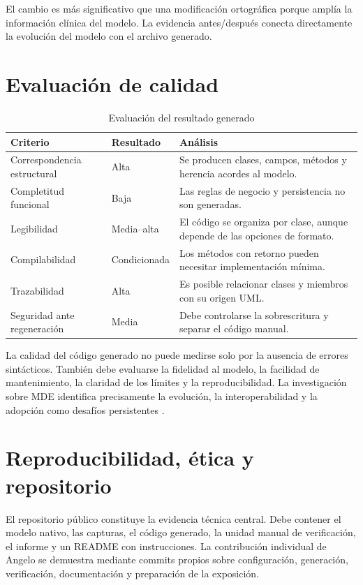El cambio es más significativo que una modificación ortográfica porque amplía la información clínica del modelo. La evidencia antes/después conecta directamente la evolución del modelo con el archivo generado.

\section{Evaluación de calidad}
\begin{table}[H]
\centering
\caption{Evaluación del resultado generado}
\begin{tabularx}{\textwidth}{L{4cm}C{2.2cm}X}
\toprule
\textbf{Criterio} & \textbf{Resultado} & \textbf{Análisis} \\
\midrule
Correspondencia estructural & Alta & Se producen clases, campos, métodos y herencia acordes al modelo. \\
Completitud funcional & Baja & Las reglas de negocio y persistencia no son generadas. \\
Legibilidad & Media--alta & El código se organiza por clase, aunque depende de las opciones de formato. \\
Compilabilidad & Condicionada & Los métodos con retorno pueden necesitar implementación mínima. \\
Trazabilidad & Alta & Es posible relacionar clases y miembros con su origen UML. \\
Seguridad ante regeneración & Media & Debe controlarse la sobrescritura y separar el código manual. \\
\bottomrule
\end{tabularx}
\end{table}

La calidad del código generado no puede medirse solo por la ausencia de errores sintácticos. También debe evaluarse la fidelidad al modelo, la facilidad de mantenimiento, la claridad de los límites y la reproducibilidad. La investigación sobre MDE identifica precisamente la evolución, la interoperabilidad y la adopción como desafíos persistentes \cite{Bucchiarone2020,Whittle2014}.

\section{Reproducibilidad, ética y repositorio}
El repositorio público constituye la evidencia técnica central. Debe contener el modelo nativo, las capturas, el código generado, la unidad manual de verificación, el informe y un README con instrucciones. La contribución individual de Angelo se demuestra mediante commits propios sobre configuración, generación, verificación, documentación y preparación de la exposición.

